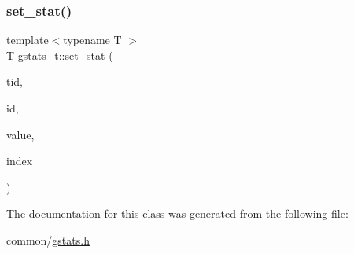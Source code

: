 \mbox{\label{classgstats__t_a39a2efb2cd4e874559dfd430dff841ae}} 
\subsubsection{\texorpdfstring{set\+\_\+stat()}{set\_stat()}}
{\footnotesize\ttfamily template$<$typename T $>$ \\
T gstats\+\_\+t\+::set\+\_\+stat (\begin{DoxyParamCaption}\item[{const int}]{tid,  }\item[{const \hyperlink{gstats_8h_a662beb90f6d56f5ee9df4d812d39aa33}{gstats\+\_\+stat\+\_\+id}}]{id,  }\item[{T}]{value,  }\item[{const int}]{index }\end{DoxyParamCaption})\hspace{0.3cm}{\ttfamily [inline]}}



The documentation for this class was generated from the following file\+:\begin{DoxyCompactItemize}
\item 
common/\hyperlink{gstats_8h}{gstats.\+h}\end{DoxyCompactItemize}
